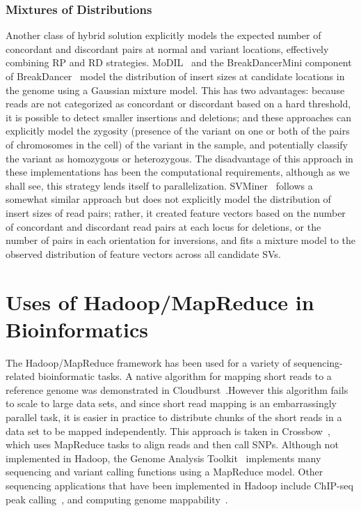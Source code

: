 \documentclass [11pt] {report}
\begin{document}
\subsubsection{Mixtures of Distributions}

Another class of hybrid solution explicitly models the expected number of concordant and discordant pairs at normal and variant locations, effectively combining RP and RD strategies. MoDIL~\cite{Lee:2009da} and the BreakDancerMini component of BreakDancer~\cite{Chen:2009p3} model the distribution of insert sizes at candidate locations in the genome using a Gaussian mixture model. This has two advantages: because reads are not categorized as concordant or discordant based on a hard threshold, it is possible to detect smaller insertions and deletions; and these approaches can explicitly model the zygosity (presence of the variant on one or both of the pairs of chromosomes in the cell) of the variant in the sample, and potentially classify the variant as homozygous or heterozygous. The disadvantage of this approach in these implementations has been the computational requirements, although as we shall see, this strategy lends itself to parallelization. SVMiner~\cite{Hayes:2012ia} follows a somewhat similar approach but does not explicitly model the distribution of insert sizes of read pairs; rather, it created feature vectors based on the number of concordant and discordant read pairs at each locus for deletions, or the number of pairs in each orientation for inversions, and fits a mixture model to the observed distribution of feature vectors across all candidate SVs.

\section{Uses of Hadoop/MapReduce in Bioinformatics}

The Hadoop/MapReduce framework has been used for a variety of sequencing-related bioinformatic tasks. A native algorithm for mapping short reads to a reference genome was demonstrated in Cloudburst~\cite{Schatz:2009p278}.However this algorithm fails to scale to large data sets, and since short read mapping is an embarrassingly parallel task, it is easier in practice to distribute chunks of the short reads in a data set to be mapped independently. This approach is taken in Crossbow~\cite{Langmead:2009p1225}, which uses MapReduce tasks to align reads and then call SNPs. Although not implemented in Hadoop, the Genome Analysis Toolkit~\cite{McKenna:2010p1051} implements many sequencing and variant calling functions using a MapReduce model. Other sequencing applications that have been implemented in Hadoop include ChIP-seq peak calling~\cite{Feng:2011p1228}, and computing genome mappability~\cite{Lee:2012bk}. 
\end{document}
